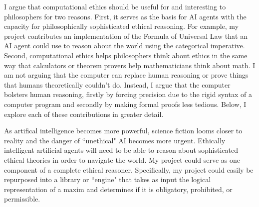 %
\begin{isabellebody}%
%
%
\isadelimtheory
%
\endisadelimtheory
%
\isatagtheory
%
\endisatagtheory
{\isafoldtheory}%
%
\isadelimtheory
%
\endisadelimtheory
%
\isadelimdocument
%
\endisadelimdocument
%
\isatagdocument
%
\isamarkuptrue%
%
\endisatagdocument
{\isafolddocument}%
%
\isadelimdocument
%
\endisadelimdocument
%
\begin{isamarkuptext}%
I argue that computational ethics should be useful for and interesting to philosophers for two 
reasons. First, it serves as the basis for AI agents with the capacity for philosophically sophisticated 
ethical reasoning. For example, my project contributes an implementation of the Formula of Universal Law
that an AI agent could use to reason about the world using the categorical imperative. Second, computational 
ethics helps philosophers think about ethics in the same way that calculators or theorem provers help 
mathematicians think about math. I am not arguing that the computer can replace human reasoning or prove things
that humans theoretically couldn't do. Instead, I argue that the computer bolsters human reasoning, firstly by forcing precision due to 
the rigid syntax of a computer program and secondly by making formal proofs less tedious. Below, I explore each of 
these contributions in greater detail.%
\end{isamarkuptext}\isamarkuptrue%
%
\isadelimdocument
%
\endisadelimdocument
%
\isatagdocument
%
\isamarkuptrue%
%
\endisatagdocument
{\isafolddocument}%
%
\isadelimdocument
%
\endisadelimdocument
%
\begin{isamarkuptext}%
As artifical intelligence becomes more powerful, science fiction looms closer to reality and the 
danger of ``unethical" AI becomes more urgent. Ethically intelligent artificial agents will need to 
be able to reason about sophisticated ethical theories in order to navigate the world. My project could 
serve as one component of a complete ethical reasoner. Specifically, my project could easily be repurposed 
into a library or ``engine" that takes as input the logical representation of a maxim and determines if it is obligatory, prohibited, 
or permissible.


\end{isamarkuptext}
\end{isabellebody}
